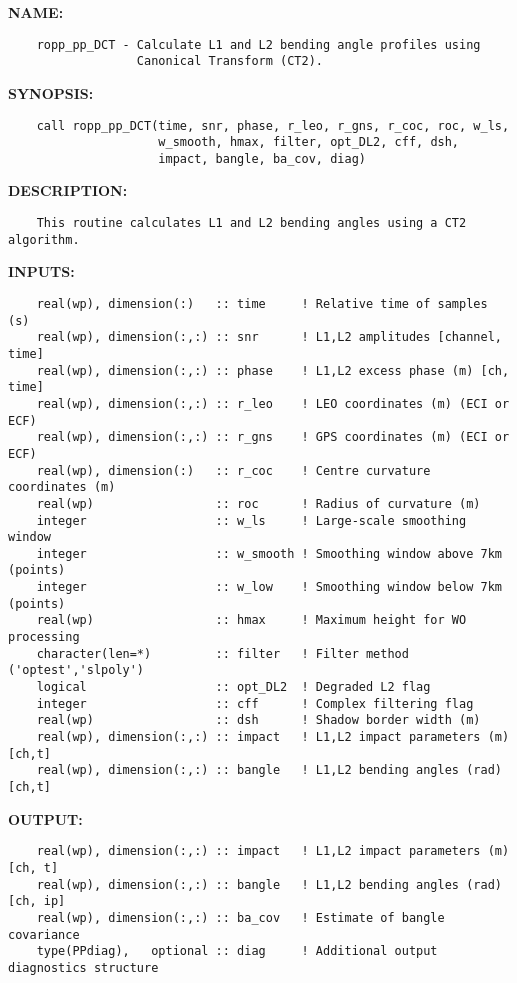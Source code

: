 \label{ch:robo104}
\label{ch:WaveOptics_ropp_pp_DCT}
\textbf{NAME:}\hspace{0.08in}\begin{Verbatim}
    ropp_pp_DCT - Calculate L1 and L2 bending angle profiles using
                  Canonical Transform (CT2).
\end{Verbatim}
\textbf{SYNOPSIS:}\hspace{0.08in}\begin{Verbatim}
    call ropp_pp_DCT(time, snr, phase, r_leo, r_gns, r_coc, roc, w_ls,
                     w_smooth, hmax, filter, opt_DL2, cff, dsh,
                     impact, bangle, ba_cov, diag)
\end{Verbatim}
\textbf{DESCRIPTION:}\hspace{0.08in}\begin{Verbatim}
    This routine calculates L1 and L2 bending angles using a CT2 algorithm.
\end{Verbatim}
\textbf{INPUTS:}\hspace{0.08in}\begin{Verbatim}
    real(wp), dimension(:)   :: time     ! Relative time of samples (s)
    real(wp), dimension(:,:) :: snr      ! L1,L2 amplitudes [channel, time]
    real(wp), dimension(:,:) :: phase    ! L1,L2 excess phase (m) [ch, time]
    real(wp), dimension(:,:) :: r_leo    ! LEO coordinates (m) (ECI or ECF)
    real(wp), dimension(:,:) :: r_gns    ! GPS coordinates (m) (ECI or ECF)
    real(wp), dimension(:)   :: r_coc    ! Centre curvature coordinates (m)
    real(wp)                 :: roc      ! Radius of curvature (m)
    integer                  :: w_ls     ! Large-scale smoothing window
    integer                  :: w_smooth ! Smoothing window above 7km (points)
    integer                  :: w_low    ! Smoothing window below 7km (points)
    real(wp)                 :: hmax     ! Maximum height for WO processing
    character(len=*)         :: filter   ! Filter method ('optest','slpoly')
    logical                  :: opt_DL2  ! Degraded L2 flag
    integer                  :: cff      ! Complex filtering flag
    real(wp)                 :: dsh      ! Shadow border width (m)
    real(wp), dimension(:,:) :: impact   ! L1,L2 impact parameters (m) [ch,t]
    real(wp), dimension(:,:) :: bangle   ! L1,L2 bending angles (rad) [ch,t]
\end{Verbatim}
\textbf{OUTPUT:}\hspace{0.08in}\begin{Verbatim}
    real(wp), dimension(:,:) :: impact   ! L1,L2 impact parameters (m) [ch, t]
    real(wp), dimension(:,:) :: bangle   ! L1,L2 bending angles (rad) [ch, ip]
    real(wp), dimension(:,:) :: ba_cov   ! Estimate of bangle covariance
    type(PPdiag),   optional :: diag     ! Additional output diagnostics structure
\end{Verbatim}
